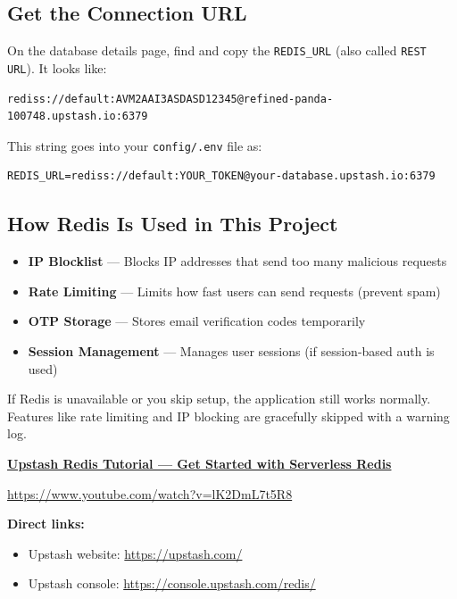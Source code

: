 \documentclass[12pt,a4paper]{article}
\begin{document}
\subsection{Get the Connection URL}

On the database details page, find and copy the \texttt{REDIS\_URL} (also called \texttt{REST URL}).
It looks like:

\begin{lstlisting}[caption=Redis connection URL example]
rediss://default:AVM2AAI3ASDASD12345@refined-panda-100748.upstash.io:6379
\end{lstlisting}

This string goes into your \texttt{config/.env} file as:

\begin{lstlisting}[caption=.env entry for Redis]
REDIS_URL=rediss://default:YOUR_TOKEN@your-database.upstash.io:6379
\end{lstlisting}

\subsection{How Redis Is Used in This Project}

\begin{itemize}
    \item \textbf{IP Blocklist} — Blocks IP addresses that send too many malicious requests
    \item \textbf{Rate Limiting} — Limits how fast users can send requests (prevent spam)
    \item \textbf{OTP Storage} — Stores email verification codes temporarily
    \item \textbf{Session Management} — Manages user sessions (if session-based auth is used)
\end{itemize}

\begin{tcolorbox}[colback=green!5!white,colframe=successgreen,title= Redis is Optional]
    If Redis is unavailable or you skip setup, the application still works normally. Features like rate limiting and IP blocking are gracefully skipped with a warning log.
\end{tcolorbox}

\begin{tcolorbox}[colback=infobox,colframe=primaryblue,title= YouTube Tutorial]
    \href{https://www.youtube.com/watch?v=lK2DmL7t5R8}{\textbf{Upstash Redis Tutorial — Get Started with Serverless Redis}}
    
    \url{https://www.youtube.com/watch?v=lK2DmL7t5R8}
    
    \textbf{Direct links:}
    \begin{itemize}
        \item Upstash website: \url{https://upstash.com/}
        \item Upstash console: \url{https://console.upstash.com/redis/}
    \end{itemize}
\end{tcolorbox}
\end{document}
